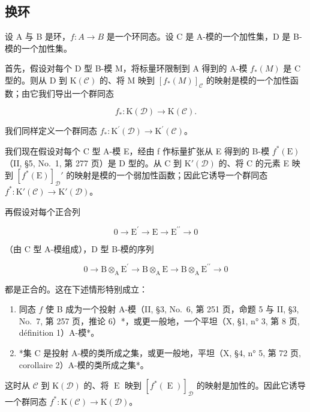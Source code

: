 \subsection{换环}

设 A 与 B 是环，\(f : A \to B\) 是一个环同态。设 C 是 A-模的一个加性集，D 是 B-模的一个加性集。

首先，假设对每个 D 型 B-模 M，将标量环限制到 A 得到的 A-模 \(f_{*}(M)\) 是 C 型的。则从 D 到 \(\mathrm{K}(\mathcal{C})\) 的、将 M 映到 \([f_{*}(M)]_{\mathcal{C}}\) 的映射是模的一个加性函数；由它我们导出一个群同态

\[
f _ {*}: \mathrm{K} (\mathcal {D}) \longrightarrow \mathrm{K} (\mathcal {C}).
\]

我们同样定义一个群同态 \(f_{*}:\mathrm{K}^{\prime}(\mathcal{D})\to \mathrm{K}^{\prime}(\mathcal{C})\)。

我们现在假设对每个 C 型 A-模 E，经由 f 作标量扩张从 E 得到的 B-模 \(f^{*}(\mathrm{E})\)（II, §5, No.~1, 第 277 页）是 D 型的。从 C 到 \(\mathrm{K}'(\mathcal{D})\) 的、将 C 的元素 E 映到 \([f^{*}(\mathrm{E})]_{\mathcal{D}}'\) 的映射是模的一个弱加性函数；因此它诱导一个群同态 \(f^{*}: \mathrm{K}'(\mathcal{C}) \to \mathrm{K}'(\mathcal{D})\)。

再假设对每个正合列

\[
0 \longrightarrow \mathrm{E} ^ {\prime} \longrightarrow \mathrm{E} \longrightarrow \mathrm{E} ^ {\prime \prime} \longrightarrow 0
\]

（由 C 型 A-模组成），D 型 B-模的序列

\[
0 \longrightarrow \mathrm{B} \otimes_ {\mathrm{A}} \mathrm{E} ^ {\prime} \longrightarrow \mathrm{B} \otimes_ {\mathrm{A}} \mathrm{E} \longrightarrow \mathrm{B} \otimes_ {\mathrm{A}} \mathrm{E} ^ {\prime \prime} \longrightarrow 0
\]

都是正合的。这在下述情形特别成立：

\begin{enumerate}
\def\labelenumi{\alph{enumi})}
\item
  同态 \(f\) 使 B 成为一个投射 A-模（II, §3, No.~6, 第 251 页，命题 5 与 II, §3, No.~7, 第 257 页，推论 6）*，或更一般地，一个平坦（X, §1, n° 3, 第 8 页, définition 1）A-模*。
\item
  *集 C 是投射 A-模的类所成之集，或更一般地，平坦（X, §4, n° 5, 第 72 页, corollaire 2）A-模的类所成之集*。
\end{enumerate}

这时从 \(\mathcal{C}\) 到 \(\mathrm{K}(\mathcal{D})\) 的、将 \(\operatorname{E}\) 映到 \([f^{*}(\operatorname{E})]_{\mathcal{D}}\) 的映射是加性的。因此它诱导一个群同态 \(f^{*}:\mathrm{K}(\mathcal{C})\to \mathrm{K}(\mathcal{D})\)。
\relax{}
